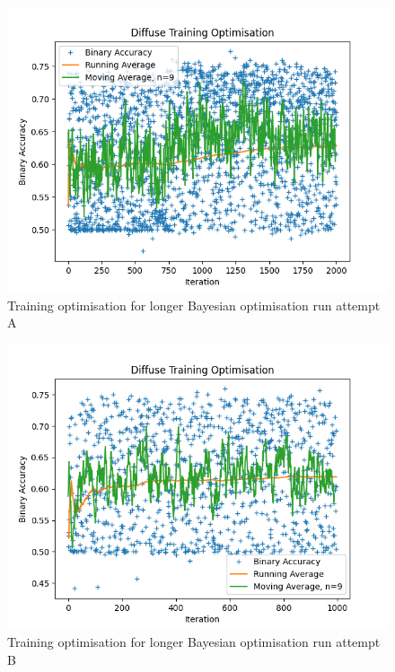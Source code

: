 \begin{figure}[] 
        \centering \includegraphics[width=\columnwidth]{figures/convplot_testfolders3.png}

        \caption{
                \label{fig:convplot_testfolders3} Training optimisation for longer Bayesian optimisation run attempt A
        }
\end{figure}
\begin{figure}[] 
        \centering \includegraphics[width=\columnwidth]{figures/convplot_febtry.png}

        \caption{
                \label{fig:convplot_febtry} Training optimisation for longer Bayesian optimisation run attempt B
        }
\end{figure}

